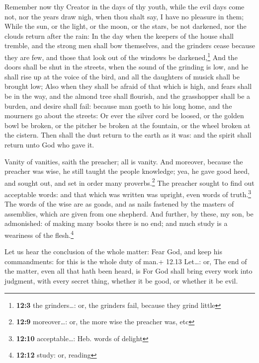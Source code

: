  Remember now thy Creator in the days of thy youth, while
the evil days come not, nor the years draw nigh, when thou shalt say, I
have no pleasure in them;  While the sun, or the light, or
the moon, or the stars, be not darkened, nor the clouds return after the
rain:  In the day when the keepers of the house shall
tremble, and the strong men shall bow themselves, and the grinders cease
because they are few, and those that look out of the windows be
darkened,\footnote{\textbf{12:3} the grinders\ldots: or, the grinders
  fail, because they grind little}  And the doors shall be
shut in the streets, when the sound of the grinding is low, and he shall
rise up at the voice of the bird, and all the daughters of musick shall
be brought low;  Also when they shall be afraid of that
which is high, and fears shall be in the way, and the almond tree shall
flourish, and the grasshopper shall be a burden, and desire shall fail:
because man goeth to his long home, and the mourners go about the
streets:  Or ever the silver cord be loosed, or the golden
bowl be broken, or the pitcher be broken at the fountain, or the wheel
broken at the cistern.  Then shall the dust return to the
earth as it was: and the spirit shall return unto God who gave it.

 Vanity of vanities, saith the preacher; all is vanity.
 And moreover, because the preacher was wise, he still
taught the people knowledge; yea, he gave good heed, and sought out, and
set in order many proverbs.\footnote{\textbf{12:9} moreover\ldots: or,
  the more wise the preacher was, etc}  The preacher
sought to find out acceptable words: and that which was written was
upright, even words of truth.\footnote{\textbf{12:10} acceptable\ldots:
  Heb. words of delight}  The words of the wise are as
goads, and as nails fastened by the masters of assemblies, which are
given from one shepherd.  And further, by these, my son,
be admonished: of making many books there is no end; and much study is a
weariness of the flesh.\footnote{\textbf{12:12} study: or, reading}

 Let us hear the conclusion of the whole matter: Fear
God, and keep his commandments: for this is the whole duty of man.+
12.13 Let\ldots: or, The end of the matter, even all that hath been
heard, is  For God shall bring every work into judgment,
with every secret thing, whether it be good, or whether it be evil.
